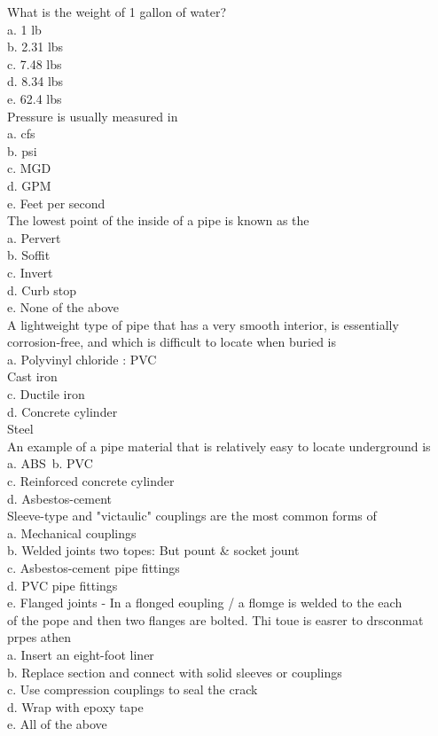 What is the weight of 1 gallon of water?\\
a. 1 lb\\
b. 2.31 lbs\\
c. 7.48 lbs\\
d. 8.34 lbs\\
e. 62.4 lbs\\

Pressure is usually measured in\\
a. cfs\\
b. psi\\
c. MGD\\
d. GPM\\
e. Feet per second\\

The lowest point of the inside of a pipe is known as the\\
a. Pervert\\
b. Soffit\\
c. Invert\\
d. Curb stop\\
e. None of the above\\

A lightweight type of pipe that has a very smooth interior, is essentially corrosion-free, and which is difficult to locate when buried is\\
a.  Polyvinyl chloride : PVC\\
Cast iron\\
c. Ductile iron\\
d. Concrete cylinder\\
Steel\\

An example of a pipe material that is relatively easy to locate underground is\\
a. ABS\
b. PVC\\
c. Reinforced concrete cylinder\\
d. Asbestos-cement\\

Sleeve-type and "victaulic" couplings are the most common forms of\\
a. Mechanical couplings\\
b. Welded joints two topes: But pount \& socket jount\\
c. Asbestos-cement pipe fittings\\
d. PVC pipe fittings\\
e. Flanged joints - In a flonged eoupling / a flomge is welded to the each\\
of the pope and then two flanges are bolted. Thi toue is easrer to drsconmat prpes athen\\
a. Insert an eight-foot liner\\
b. Replace section and connect with solid sleeves or couplings\\
c. Use compression couplings to seal the crack\\
d. Wrap with epoxy tape\\
e. All of the above\\

